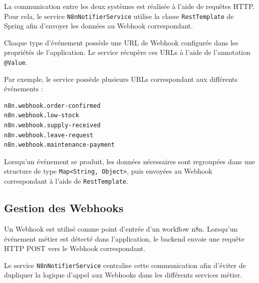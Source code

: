 La communication entre les deux systèmes est réalisée à l'aide de requêtes HTTP. 
Pour cela, le service \texttt{N8nNotifierService} utilise la classe \texttt{RestTemplate} de Spring afin d'envoyer les données au Webhook correspondant.

Chaque type d'événement possède une URL de Webhook configurée dans les propriétés de l'application. 
Le service récupère ces URLs à l'aide de l'annotation \texttt{@Value}.

Par exemple, le service possède plusieurs URLs correspondant aux différents événements :

\begin{verbatim}
n8n.webhook.order-confirmed
n8n.webhook.low-stock
n8n.webhook.supply-received
n8n.webhook.leave-request
n8n.webhook.maintenance-payment
\end{verbatim}

Lorsqu'un événement se produit, les données nécessaires sont regroupées dans une structure de type \texttt{Map<String, Object>}, puis envoyées au Webhook correspondant à l'aide de \texttt{RestTemplate}.

%


\subsection{Gestion des Webhooks}

Un Webhook est utilisé comme point d'entrée d'un workflow n8n. 
Lorsqu'un événement métier est détecté dans l'application, le backend envoie une requête HTTP POST vers le Webhook correspondant.

Le service \texttt{N8nNotifierService} centralise cette communication afin d'éviter de dupliquer la logique d'appel aux Webhooks dans les différents services métier.

